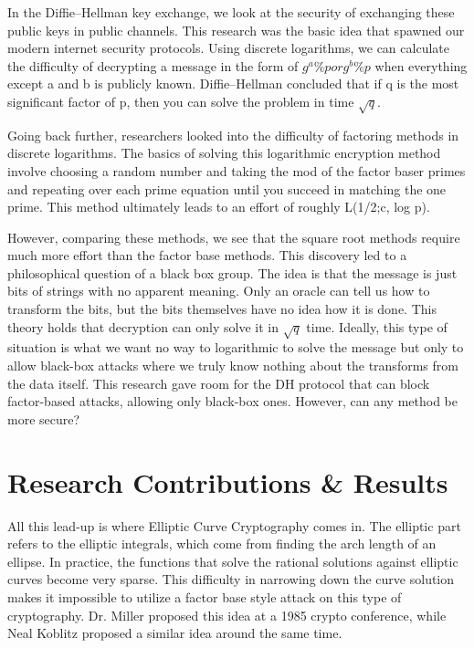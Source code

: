 \documentclass[journal,onecolumn]{IEEEtran}
\begin{document}
In the Diffie–Hellman key exchange, we look at the security of exchanging these public keys in public channels. This research was the basic idea that spawned our modern internet security protocols. Using discrete logarithms, we can calculate the difficulty of decrypting a message in the form of $g^a \% p or g^b \% p$ when everything except a and b is publicly known. Diffie–Hellman concluded that if q is the most significant factor of p, then you can solve the problem in time $\sqrt{q}$. 

Going back further, researchers looked into the difficulty of factoring methods in discrete logarithms. The basics of solving this logarithmic encryption method involve choosing a random number and taking the mod of the factor baser primes and repeating over each prime equation until you succeed in matching the one prime. This method ultimately leads to an effort of roughly L(1/2;c, log p).

However, comparing these methods, we see that the square root methods require much more effort than the factor base methods. This discovery led to a philosophical question of a black box group. The idea is that the message is just bits of strings with no apparent meaning. Only an oracle can tell us how to transform the bits, but the bits themselves have no idea how it is done. This theory holds that decryption can only solve it in $\sqrt{q}$ time. Ideally, this type of situation is what we want no way to logarithmic to solve the message but only to allow black-box attacks where we truly know nothing about the transforms from the data itself.  This research gave room for the DH protocol that can block factor-based attacks, allowing only black-box ones. However, can any method be more secure? 

\section{Research Contributions \& Results}

All this lead-up is where Elliptic Curve Cryptography comes in. The elliptic part refers to the elliptic integrals, which come from finding the arch length of an ellipse. In practice, the functions that solve the rational solutions against elliptic curves become very sparse. This difficulty in narrowing down the curve solution makes it impossible to utilize a factor base style attack on this type of cryptography. Dr. Miller proposed this idea at a 1985 crypto conference, while Neal Koblitz proposed a similar idea around the same time. 
\end{document}

